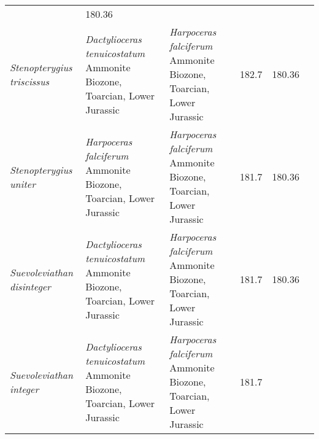 \begin{longtabu}{>{\itshape}lXXSSl}
                                                                      & 180.36
                                                                      &
                                                                      \cite{Maisch2008P,Maxwell2012JP} \\        
	Stenopterygius triscissus                            &
        \emph{Dactylioceras tenuicostatum} Ammonite Biozone, Toarcian, Lower
        Jurassic                                                      &
        \emph{Harpoceras falciferum} Ammonite Biozone, Toarcian, Lower Jurassic
                                                                      & 182.7
                                                                      & 180.36
                                                                      &
                                                                      \cite{Maisch2008P,Maxwell2012JP} \\        
	Stenopterygius uniter                                & \emph{Harpoceras
        falciferum} Ammonite Biozone, Toarcian, Lower Jurassic
                                                             & \emph{Harpoceras
        falciferum} Ammonite Biozone, Toarcian, Lower Jurassic
                                                             & 181.7
                                                             & 180.36
                                                             &
                                                             \cite{Maisch2008P,Maxwell2012JP} \\        
	Suevoleviathan disinteger                            &
        \emph{Dactylioceras tenuicostatum} Ammonite Biozone, Toarcian, Lower
        Jurassic                                                      &
        \emph{Harpoceras falciferum} Ammonite Biozone, Toarcian, Lower Jurassic
                                                                      & 181.7
                                                                      & 180.36
                                                                      &
                                                                      \cite{vonHuene1922,Maisch1998NJGPAd} \\          
	Suevoleviathan integer                               &
        \emph{Dactylioceras tenuicostatum} Ammonite Biozone, Toarcian, Lower
        Jurassic                                                      &
        \emph{Harpoceras falciferum} Ammonite Biozone, Toarcian, Lower Jurassic
                                                                      & 181.7

\end{longtabu}

